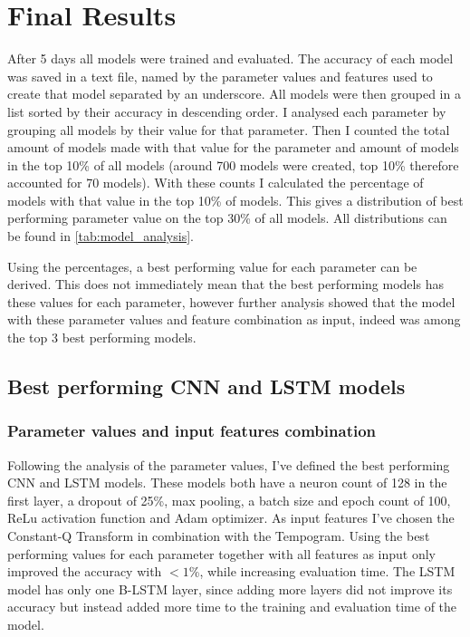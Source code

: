 \section{Final Results}

After 5 days all models were trained and evaluated. The accuracy of each model was saved in a text file, named by the parameter values and features used to create that model separated by an underscore. All models were then grouped in a list sorted by their accuracy in descending order. I analysed each parameter by grouping all models by their value for that parameter. Then I counted the total amount of models made with that value for the parameter and amount of models in the top 10\% of all models (around 700 models were created, top 10\% therefore accounted for 70 models). With these counts I calculated the percentage of models with that value in the top 10\% of models. This gives a distribution of best performing parameter value on the top 30\% of all models. All distributions can be found in \autoref{tab:model_analysis}.

Using the percentages, a best performing value for each parameter can be derived. This does not immediately mean that the best performing models has these values for each parameter, however further analysis showed that the model with these parameter values and feature combination as input, indeed was among the top 3 best performing models. 

\subsection{Best performing CNN and LSTM models}
\subsubsection{Parameter values and input features combination}
Following the analysis of the parameter values, I've defined the best performing CNN and LSTM models. These models both have a neuron count of 128 in the first layer, a dropout of 25\%, max pooling, a batch size and epoch count of 100, ReLu activation function and Adam optimizer. As input features I've chosen the Constant-Q Transform in combination with the Tempogram. Using the best performing values for each parameter together with all features as input only improved the accuracy with $<1$\%, while increasing evaluation time. The LSTM model has only one B-LSTM layer, since adding more layers did not improve its accuracy but instead added more time to the training and evaluation time of the model.


